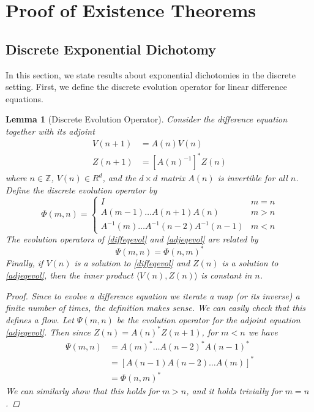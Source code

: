 \documentclass[12pt]{article}
\def\Z{{\mathbb Z}}
\newtheorem{lemma}{Lemma}
\begin{document}
\section{Proof of Existence Theorems}

\subsection{Discrete Exponential Dichotomy}

In this section, we state results about exponential dichotomies in the discrete setting. First, we define the discrete evolution operator for linear difference equations.

\begin{lemma}[Discrete Evolution Operator]\label{evolop}
Consider the difference equation together with its adjoint
\begin{align}
V(n+1) &= A(n) V(n) \label{diffeqevol} \\
Z(n+1) &= [A(n)^{-1}]^* Z(n) \label{adjeqevol}
\end{align}
where $n \in \Z$, $V(n) \in R^d$, and the $d \times d$ matrix $A(n)$ is invertible for all $n$. Define the discrete evolution operator by
\begin{equation}\label{evol}
\Phi(m, n) = 
\begin{cases}
I & m = n \\
A(m-1) \dots A(n+1) A(n) & m > n \\
A^{-1}(m) \dots A^{-1}(n-2) A^{-1}(n-1) & m < n
\end{cases}
\end{equation}
The evolution operators of \eqref{diffeqevol} and \eqref{adjeqevol} are related by
\begin{equation}\label{adjevol}
\Psi(m, n) = \Phi(n, m)^*
\end{equation}
Finally, if $V(n)$ is a solution to \eqref{diffeqevol} and $Z(n)$ is a solution to \eqref{adjeqevol}, then the inner product $\langle V(n), Z(n) \rangle$ is constant in $n$.

\begin{proof}
Since to evolve a difference equation we iterate a map (or its inverse) a finite number of times, the definition makes sense. We can easily check that this defines a flow. Let $\Psi(m, n)$ be the evolution operator for the adjoint equation \eqref{adjeqevol}. Then since $Z(n) = A(n)^* Z(n+1)$, for $m < n$ we have
\begin{align*}
\Psi(m, n) &= A(m)^* \dots A(n-2)^* A(n-1)^* \\
&= [A(n-1) A(n-2) \dots A(m)]^* \\
&= \Phi(n, m)^*
\end{align*}
We can similarly show that this holds for $m > n$, and it holds trivially for $m = n$.


\end{proof}
\end{lemma}
\end{document}
